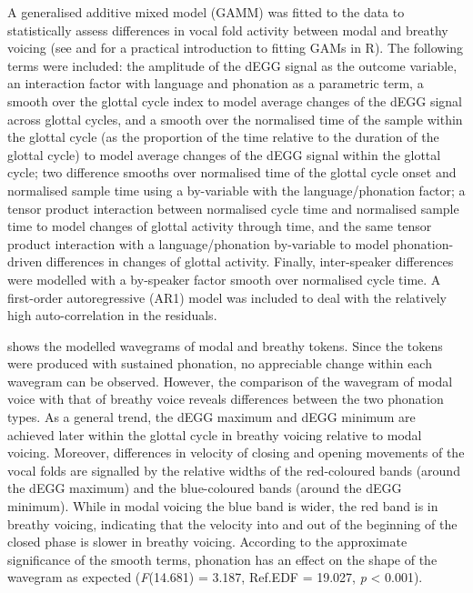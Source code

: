 \documentclass[
  11pt,
  a4paper,
]{article}
\begin{document}
A generalised additive mixed model (GAMM) was fitted to the data to
statistically assess differences in vocal fold activity between modal
and breathy voicing (see \citealt{soskuthy2017} and
\citealt{wieling2018} for a practical introduction to fitting GAMs in
R). The following terms were included: the amplitude of the dEGG signal
as the outcome variable, an interaction factor with language and
phonation as a parametric term, a smooth over the glottal cycle index to
model average changes of the dEGG signal across glottal cycles, and a
smooth over the normalised time of the sample within the glottal cycle
(as the proportion of the time relative to the duration of the glottal
cycle) to model average changes of the dEGG signal within the glottal
cycle; two difference smooths over normalised time of the glottal cycle
onset and normalised sample time using a by-variable with the
language/phonation factor; a tensor product interaction between
normalised cycle time and normalised sample time to model changes of
glottal activity through time, and the same tensor product interaction
with a language/phonation by-variable to model phonation-driven
differences in changes of glottal activity. Finally, inter-speaker
differences were modelled with a by-speaker factor smooth over
normalised cycle time. A first-order autoregressive (AR1) model was
included to deal with the relatively high auto-correlation in the
residuals.

 shows the modelled wavegrams of modal and breathy
tokens. Since the tokens were produced with sustained phonation, no
appreciable change within each wavegram can be observed. However, the
comparison of the wavegram of modal voice with that of breathy voice
reveals differences between the two phonation types. As a general trend,
the dEGG maximum and dEGG minimum are achieved later within the glottal
cycle in breathy voicing relative to modal voicing. Moreover,
differences in velocity of closing and opening movements of the vocal
folds are signalled by the relative widths of the red-coloured bands
(around the dEGG maximum) and the blue-coloured bands (around the dEGG
minimum). While in modal voicing the blue band is wider, the red band is
in breathy voicing, indicating that the velocity into and out of the
beginning of the closed phase is slower in breathy voicing. According to
the approximate significance of the smooth terms, phonation has an
effect on the shape of the wavegram as expected (\emph{F}(14.681) =
3.187, Ref.EDF = 19.027, \emph{p} \textless{} 0.001).
\end{document}
